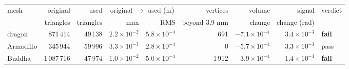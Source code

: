 \begin{tabular}{lrrrrrrrl}
\toprule
mesh & original & used & \multicolumn{2}{c}{original $\to$ used (m)} & vertices & volume & signal & verdict \\
\cmidrule(lr){4-5}
 & triangles & triangles & max & RMS & beyond 3.9 mm & change & change (rad) & \\
\midrule
dragon & 871\,414 & 49\,138 & $2.2\times10^{-2}$ & $5.8\times10^{-4}$ & 691 & $-7.1\times10^{-4}$ & $3.4\times10^{-3}$ & \textbf{fail} \\
Armadillo & 345\,944 & 59\,996 & $3.3\times10^{-3}$ & $2.8\times10^{-4}$ & 0 & $-5.7\times10^{-4}$ & $3.3\times10^{-3}$ & pass \\
Buddha & 1\,087\,716 & 47\,974 & $1.0\times10^{-2}$ & $5.0\times10^{-4}$ & 1\,912 & $-3.9\times10^{-4}$ & $1.4\times10^{-3}$ & \textbf{fail} \\
\bottomrule
\end{tabular}
